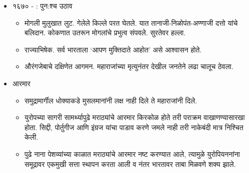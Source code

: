 \begin{itemize}
\item १६७० - : पुन:श्च उठाव
	\begin{itemize}
	\item मोगली मुलुखात लुट. गेलेले किल्ले परत घेतले. यात तानाजी-निळोपंत-अण्णाजी दत्तो यांचे बलिदान. कोकणात उतरून मोगलांचे प्रभुत्व संपवले. सुरतेवर हल्ला.
	\item राज्याभिषेक. सर्व भारताला ‘आपण मुक्तिदाते आहोत’ असे आश्वासन होते.
	\item औरंगजेबाचे दक्षिणेत आगमन. महाराजांच्या मृत्युनंतर देखील जनतेने लढा चालूच ठेवला.
	\end{itemize}

\item आरमार
	\begin{itemize}
	\item समुद्रामार्गील धोक्याकडे मुसलमानांनी लक्ष नाही दिले ते महाराजांनी दिले.
	\item युरोपच्या सागरी सामर्थ्यापुढे मराठ्यांचे आरमार किरकोळ होते तरी पराक्रम वाखाणण्यासारखा होता. सिद्दी, पोर्तुगीज आणि इंग्रज यांचा पाडाव करणे जमले नाही तरी नाकेबंदी मात्र निश्चित केली.
	\item पुढे नाना पेशव्यांच्या काळात मराठ्यांचे आरमार नष्ट करण्यात आले, त्यामुळे युरोपियननांना समूद्रावर एकमुखी सत्ता स्थापन करता आली व नंतर भारतावर ताबा मिळवणे शक्य झाले.
	\end{itemize}


\end{itemize}
